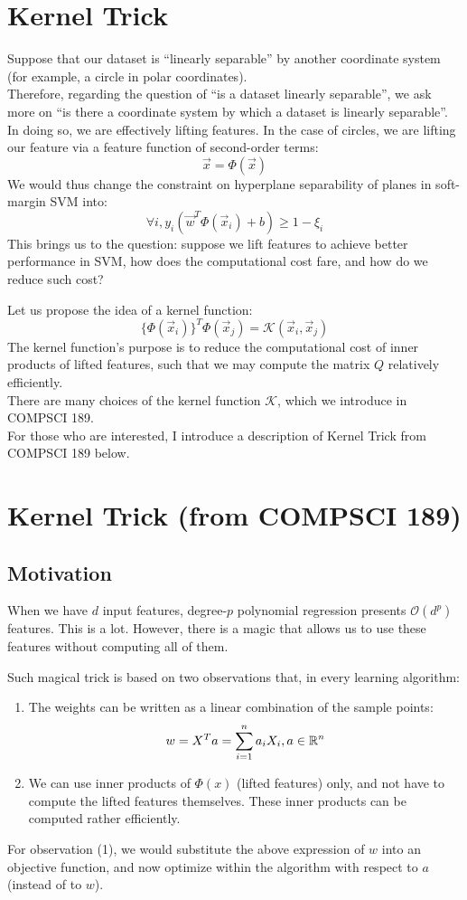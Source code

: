\section{Kernel Trick}
Suppose that our dataset is ``linearly separable'' by another coordinate system (for example, a circle in polar coordinates). \\
Therefore, regarding the question of ``is a dataset linearly separable'', we ask more on ``is there a coordinate system by which a dataset is linearly separable''.
In doing so, we are effectively lifting features. In the case of circles, we are lifting our feature via a feature function of second-order terms:
\[
    \vec{x} = \Phi(\vec{x})
\]
We would thus change the constraint on hyperplane separability of planes in soft-margin SVM into:
\[
    \forall i, y_i (\vec{w}^T \Phi(\vec{x}_i) + b) \geq 1 - \xi_i
\]
This brings us to the question: suppose we lift features to achieve better performance in SVM, how does the computational cost fare, and how do we reduce such cost?

Let us propose the idea of a kernel function:
\[
    \{\Phi(\vec{x}_i)\}^T \Phi(\vec{x}_j) = \mathcal{K}(\vec{x}_i, \vec{x}_j)
\]
The kernel function's purpose is to reduce the computational cost of inner products of lifted features, such that we may compute the matrix $Q$ relatively efficiently. \\
There are many choices of the kernel function $\mathcal{K}$, which we introduce in COMPSCI 189. \\

For those who are interested, I introduce a description of Kernel Trick from COMPSCI 189 below.

\section{Kernel Trick (from COMPSCI 189)}
\subsection{Motivation}
When we have $d$ input features, degree-$p$ polynomial regression presents $\mathcal{O} (d^p)$ features.
This is a lot.
However, there is a magic that allows us to use these features without computing all of them.

Such magical trick is based on two observations that, in every learning algorithm:
\begin{enumerate}
    \item The weights can be written as a linear combination of the sample points:
    \[
        w = X^T a = \sum_{i = 1}^n a_i X_i, a \in \mathbb{R}^n
    \]
    \item We can use inner products of $\Phi(x)$ (lifted features) only, and not have to compute the lifted features themselves. These inner products can be computed rather efficiently.
\end{enumerate}
For observation (1), we would substitute the above expression of $w$ into an objective function, and now optimize within the algorithm with respect to $a$ (instead of to $w$).

